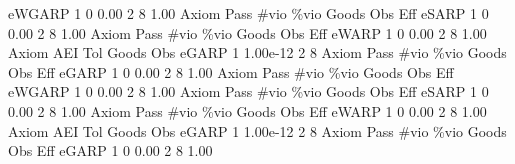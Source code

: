       eWGARP {\VBAR}    1           0        0.00           2           8        1.00  
{\smallskip}
{\smallskip}
{\smallskip}
       Axiom {\VBAR} Pass        \#vio        \%vio       Goods         Obs         Eff  
       eSARP {\VBAR}    1           0        0.00           2           8        1.00  
{\smallskip}
{\smallskip}
{\smallskip}
       Axiom {\VBAR} Pass        \#vio        \%vio       Goods         Obs         Eff  
       eWARP {\VBAR}    1           0        0.00           2           8        1.00  
{\smallskip}
       Axiom {\VBAR}       AEI        Tol      Goods        Obs 
       eGARP {\VBAR}         1   1.00e-12          2          8 
{\smallskip}
{\smallskip}
{\smallskip}
       Axiom {\VBAR} Pass        \#vio        \%vio       Goods         Obs         Eff  
       eGARP {\VBAR}    1           0        0.00           2           8        1.00  
{\smallskip}
{\smallskip}
{\smallskip}
       Axiom {\VBAR} Pass        \#vio        \%vio       Goods         Obs         Eff  
      eWGARP {\VBAR}    1           0        0.00           2           8        1.00  
{\smallskip}
{\smallskip}
{\smallskip}
       Axiom {\VBAR} Pass        \#vio        \%vio       Goods         Obs         Eff  
       eSARP {\VBAR}    1           0        0.00           2           8        1.00  
{\smallskip}
{\smallskip}
{\smallskip}
       Axiom {\VBAR} Pass        \#vio        \%vio       Goods         Obs         Eff  
       eWARP {\VBAR}    1           0        0.00           2           8        1.00  
{\smallskip}
       Axiom {\VBAR}       AEI        Tol      Goods        Obs 
       eGARP {\VBAR}         1   1.00e-12          2          8 
{\smallskip}
{\smallskip}
{\smallskip}
       Axiom {\VBAR} Pass        \#vio        \%vio       Goods         Obs         Eff  
       eGARP {\VBAR}    1           0        0.00           2           8        1.00  
{\smallskip}
